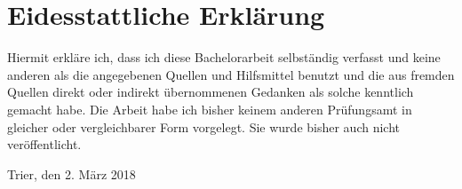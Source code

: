 \thispagestyle{empty}
\par
\chapter*{Eidesstattliche Erklärung}

Hiermit erkläre ich, dass ich diese Bachelorarbeit selbständig verfasst und keine anderen als die angegebenen Quellen und Hilfsmittel benutzt und die aus fremden Quellen direkt oder indirekt übernommenen Gedanken als solche kenntlich gemacht habe. Die Arbeit habe ich bisher keinem anderen Prüfungsamt in gleicher oder vergleichbarer Form vorgelegt. Sie wurde bisher auch nicht veröffentlicht.

Trier, den 2. März 2018

\clearpage






